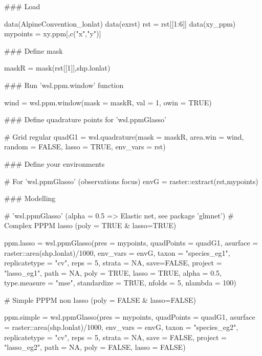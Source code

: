\documentclass[a4paper]{book}
\begin{document}
\begin{Examples}
\begin{ExampleCode}

### Load

data(AlpineConvention_lonlat)
data(exrst)
rst = rst[[1:6]]
data(xy_ppm)
mypoints = xy.ppm[,c("x","y")]

### Define mask

maskR = mask(rst[[1]],shp.lonlat)

### Run 'wsl.ppm.window' function

wind = wsl.ppm.window(mask = maskR,
                      val = 1,
                      owin = TRUE)

### Define quadrature points for 'wsl.ppmGlasso'

   # Grid regular
quadG1 = wsl.quadrature(mask = maskR,
                        area.win = wind,
                        random = FALSE,
                        lasso = TRUE,
                        env_vars = rst)

### Define your environments

   # For 'wsl.ppmGlasso' (observations focus)
envG = raster::extract(rst,mypoints)

### Modelling

   # 'wsl.ppmGlasso' (alpha = 0.5 => Elastic net, see package 'glmnet')
       # Complex PPPM lasso (poly = TRUE & lasso=TRUE)

ppm.lasso = wsl.ppmGlasso(pres = mypoints,
                       quadPoints = quadG1,
                       asurface = raster::area(shp.lonlat)/1000,
                       env_vars = envG,
                       taxon = "species_eg1",
                       replicatetype = "cv",
                       reps = 5,
                       strata = NA,
                       save=FALSE,
                       project = "lasso_eg1",
                       path = NA,
                       poly = TRUE,
                       lasso = TRUE,
                       alpha = 0.5,
                       type.measure = "mse",
                       standardize = TRUE,
                       nfolds = 5,
                       nlambda = 100)

       # Simple PPPM non lasso (poly = FALSE & lasso=FALSE)

ppm.simple = wsl.ppmGlasso(pres = mypoints,
                       quadPoints = quadG1,
                       asurface = raster::area(shp.lonlat)/1000,
                       env_vars = envG,
                       taxon = "species_eg2",
                       replicatetype = "cv",
                       reps = 5,
                       strata = NA,
                       save = FALSE,
                       project = "lasso_eg2",
                       path = NA,
                       poly = FALSE,
                       lasso = FALSE)

\end{ExampleCode}
\end{Examples}
\end{document}
